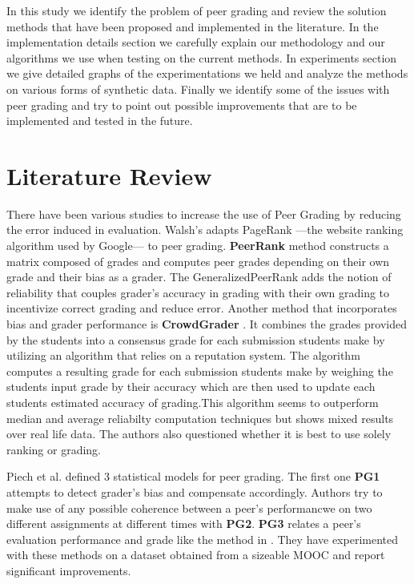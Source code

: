 \documentclass[a4paper]{article}
\begin{document}
In this study we identify the problem of peer grading and review the solution methods that have been
proposed and implemented in the literature. In the implementation details section we carefully explain
our methodology and our algorithms we use when testing on the current methods. In experiments section
we give detailed graphs of the experimentations we held and analyze the methods on various forms of 
synthetic data. Finally we identify some of the issues with peer grading and try to point out possible
improvements that are to be implemented and tested in the future.
\section{Literature Review}
	There have been various studies to increase the use of Peer Grading by reducing the error
 induced in evaluation. Walsh's \cite{Walsh14a} adapts PageRank ---the website ranking algorithm
   used by Google--- \cite{page1999pagerank} to peer grading. \textbf{PeerRank} method
constructs a matrix composed of grades and computes peer grades depending on their own grade and
their bias as a grader. The GeneralizedPeerRank adds the notion of reliability that couples
grader's accuracy in grading with their own grading to incentivize correct grading and reduce
error. Another method that incorporates bias and grader performance is \textbf{CrowdGrader}
    \cite{Alfaros13}. It combines the
grades provided by the students into a consensus grade for each submission students make by
utilizing an algorithm that relies on a reputation system. The algorithm computes a resulting
grade for each submission students make by weighing the students input grade by
their accuracy which are then used to update each students estimated accuracy of grading.This
algorithm seems to outperform median and average reliabilty
computation techniques but shows mixed results over real life data.
The authors also questioned whether it is best to use solely ranking or grading.

	Piech et al.\cite{PiechHCDNK13} defined 3 statistical models for peer grading. The first one
\textbf{PG1} attempts to detect grader's bias and compensate accordingly. Authors try to
make use of any possible coherence between a peer's performancwe on two different
assignments at different times with \textbf{PG2}. \textbf{PG3} relates a peer's evaluation
performance and grade like the method in \cite{Walsh14a}. They have experimented with these
methods on a dataset obtained from a sizeable MOOC and report significant improvements.
\end{document}
